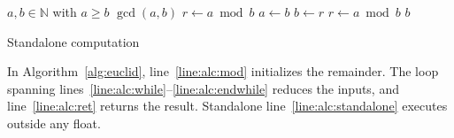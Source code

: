 \documentclass{article}
\begin{document}
\begin{algorithm}
\caption{Euclidean Algorithm}\label{alg:euclid}
\begin{algorithmic}[1]
\REQUIRE $a, b \in \mathbb{N}$ with $a \ge b$
\ENSURE $\gcd(a, b)$
\STATE $r \leftarrow a \bmod b$\label{line:alc:mod}
\label{line:alc:while}
  \STATE $a \leftarrow b$
  \STATE $b \leftarrow r$
  \STATE $r \leftarrow a \bmod b$
\ENDWHILE\label{line:alc:endwhile}
\RETURN $b$\label{line:alc:ret}
\end{algorithmic}
\end{algorithm}

\begin{algorithmic}[1]
\STATE Standalone computation\label{line:alc:standalone}
\end{algorithmic}

In Algorithm~\ref{alg:euclid}, line~\ref{line:alc:mod} initializes the remainder.
The loop spanning lines~\ref{line:alc:while}--\ref{line:alc:endwhile} reduces the inputs,
and line~\ref{line:alc:ret} returns the result.
Standalone line~\ref{line:alc:standalone} executes outside any float.
\end{document}
